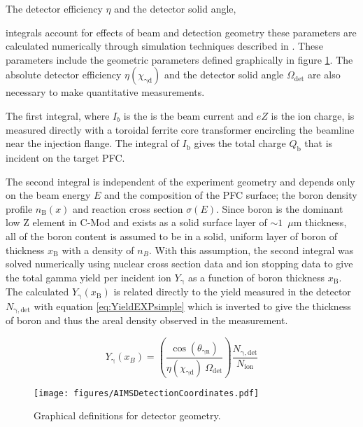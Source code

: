 \documentclass[final,3p,times,twocolumn]{elsarticle}
\begin{document}
The detector efficiency $\eta$ and the detector solid angle, 


integrals account for effects of beam and detection geometry these parameters are calculated numerically through simulation techniques described in \cite{AIMSBeamSim}. These parameters include the geometric parameters defined graphically in figure \ref{fig:AIMSDetectionCoordinates}. The absolute detector efficiency $\eta(\chi_\mathrm{\gamma d})$ and the detector solid angle $\Omega_\mathrm{det}$ are also necessary to make quantitative measurements. 

The first integral, where $I_{b}$ is the is the beam current and $eZ$ is the ion charge, is measured directly with a toroidal ferrite core transformer encircling the beamline near the injection flange.  The integral of $I_\mathrm{b}$ gives the total charge $Q_\mathrm{b}$ that is incident on the target PFC. 

The second integral is independent of the experiment geometry and depends only on the beam energy $E$ and the composition of the PFC surface; the boron density profile $n_\mathrm{B}(x)$ and reaction cross section $\sigma(E)$. Since boron is the dominant low Z element in C-Mod and exists as a solid surface layer of $\sim 1$~$\mu$m thickness, all of the boron content is assumed to be in a solid, uniform layer of boron of thickness $x_\mathrm{B}$ with a density of $n_B$. With this assumption, the second integral was solved numerically using nuclear cross section data \cite{sziki2006gamma} and ion stopping data \cite{SRIM} to give the total gamma yield per incident ion $Y_\mathrm{\gamma}$ as a function of boron thickness $x_\mathrm{B}$. The calculated $Y_\mathrm{\gamma}(x_\mathrm{B})$ is related directly to the yield measured in the detector $N_\mathrm{\gamma,det}$ with equation \ref{eq:YieldEXPsimple} which is inverted to give the thickness of boron and thus the areal density observed in the measurement.  

\begin{equation}
Y_\mathrm{\gamma}(x_B)  =  \left(\frac{\cos(\theta_\mathrm{\gamma n})}{\eta(\chi_\mathrm{\gamma d}) \:\Omega_\mathrm{det}}\right) \frac{N_\mathrm{\gamma,det}}{N_\mathrm{ion}}
\label{eq:YieldEXPsimple}
\end{equation}


\begin{figure}[!h]
  \centering
  \texttt{[image: figures/AIMSDetectionCoordinates.pdf]}
  \caption{Graphical definitions for detector geometry.}
  \label{fig:AIMSDetectionCoordinates}
\end{figure}
\end{document}
